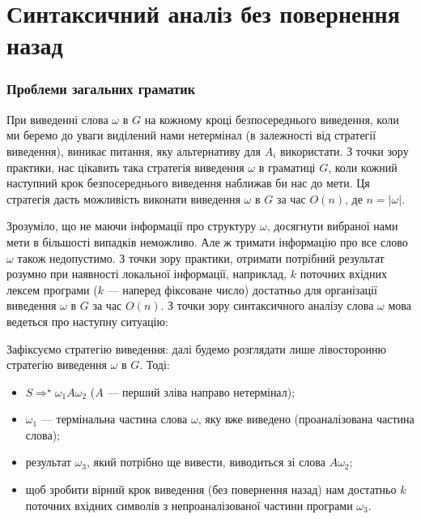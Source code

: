 \setcounter{section}{8}

\section{Синтаксичний аналіз без повернення назад}

\subsubsection{Проблеми загальних граматик}

При виведенні слова $\omega$ в $G$ на кожному кроці безпосереднього виведення, коли ми беремо до уваги виділений нами нетермінал (в залежності від стратегії виведення), виникає питання, яку альтернативу для $A_i$ використати. З точки зору практики, нас цікавить така стратегія виведення $\omega$ в граматиці $G$, коли кожний наступний крок безпосереднього виведення наближав би нас до мети. Ця стратегія дасть можливість виконати виведення $\omega$ в $G$ за час $O(n)$, де $n = |\omega|$. \medskip

Зрозуміло, що не маючи інформації про структуру $\omega$, досягнути вибраної нами мети в більшості випадків неможливо. Але ж тримати інформацію про все слово $\omega$ також недопустимо. З точки зору практики, отримати потрібний результат розумно при наявності локальної інформації, наприклад, $k$ поточних вхідних лексем програми ($k$ --- наперед фіксоване число) достатньо для організації виведення $\omega$ в $G$ за час $O(n)$. З точки зору синтаксичного аналізу слова $\omega$ мова ведеться про наступну ситуацію:
\begin{figure}[H]
	\centering
	
\end{figure}

Зафіксуємо стратегію виведення: далі будемо розглядати лише лівосторонню \allowbreak стратегію виведення $\omega$ в $G$. Тоді:
\begin{itemize}
	\item $S \Rightarrow^\star \omega_1 A \omega_2$ ($A$ --- перший зліва направо нетермінал);
	\item $\omega_1$ --- термінальна частина слова $\omega$, яку вже виведено (проаналізована частина слова);
	\item результат $\omega_3$, який потрібно ще вивести, виводиться зі слова $A \omega_2$;
	\item щоб зробити вірний крок виведення (без повернення назад) нам достатньо $k$ поточних  вхідних символів з непроаналізованої частини програми $\omega_3$.
\end{itemize}

